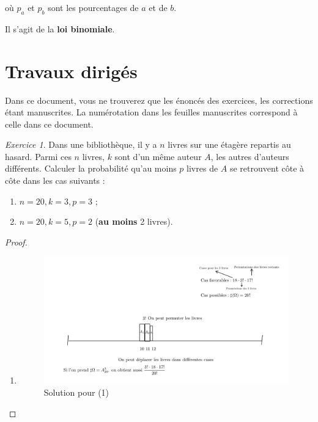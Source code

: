 \documentclass[french]{book}
\theoremstyle{definition}
\theoremstyle{remark}
\newtheorem{exo}{Exercice}
\begin{document}
où $p_a$ et $p_b$ sont les pourcentages de $a$ et de $b$.

Il s'agit de la \textbf{loi binomiale}.


\chapter*{Travaux dirigés}

Dans ce document, vous ne trouverez que les énoncés des exercices, les corrections étant manuscrites. La numérotation dans les feuilles manuscrites correspond à celle dans ce document.

\begin{exo}
  Dans une bibliothèque, il y a $n$ livres sur une étagère repartis au hasard. Parmi ces $n$ livres, $k$ sont d'un même auteur $A$, les autres d'auteurs différents. Calculer la probabilité qu'au moins $p$ livres de $A$ se retrouvent côte à côte dans les cas suivants :
  \begin{enumerate}
    \item $n=20, k=3, p=3$ ;
    \item $n=20, k=5, p=2$ (\textbf{au moins} 2 livres).
  \end{enumerate}
\end{exo}

\begin{proof}

  \

  \begin{enumerate}
    \item

    \begin{figure}[h!]
      \centering
      \includegraphics[scale=0.3]{figures/exo_livres.png}
      \caption{Solution pour (1)}
      \label{}
    \end{figure}

  \end{enumerate}
\end{proof}
\end{document}
